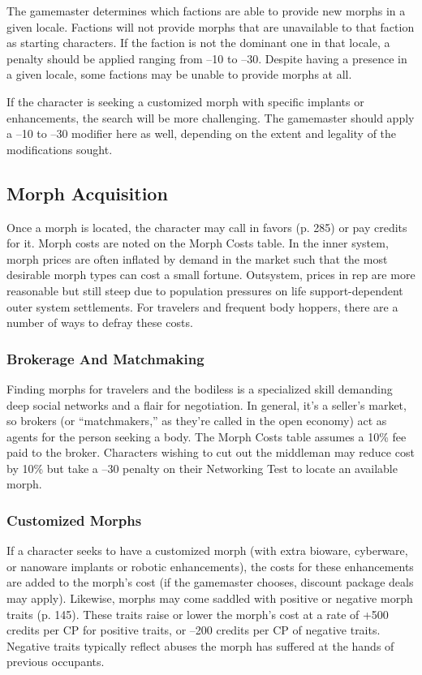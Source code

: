 The gamemaster determines which factions are able 
to provide new morphs in a given locale. Factions 
will not provide morphs that are unavailable to that 
faction as starting characters. If the faction is not the 
dominant one in that locale, a penalty should be applied
ranging from –10 to –30. Despite having a presence
in a given locale, some factions may be unable to
provide morphs at all.

If the character is seeking a customized morph with 
specific implants or enhancements, the search will be 
more challenging. The gamemaster should apply a –10 
to –30 modifier here as well, depending on the extent 
and legality of the modifications sought.

\subsection{Morph Acquisition}

Once a morph is located, the character may call in 
favors (p. 285) or pay credits for it. Morph costs are 
noted on the Morph Costs table. In the inner system, 
morph prices are often inflated by demand in the 
market such that the most desirable morph types can 
cost a small fortune. Outsystem, prices in rep are more 
reasonable but still steep due to population pressures 
on life support-dependent outer system settlements. 
For travelers and frequent body hoppers, there are a 
number of ways to defray these costs.

\subsubsection{Brokerage And Matchmaking}

Finding morphs for travelers and the bodiless is a 
specialized skill demanding deep social networks and 
a flair for negotiation. In general, it's a seller's market, 
so brokers (or ``matchmakers,'' as they're called in 
the open economy) act as agents for the person seeking
a body. The Morph Costs table assumes a 10\%
fee paid to the broker. Characters wishing to cut out 
the middleman may reduce cost by 10\% but take a 
–30 penalty on their Networking Test to locate an 
available morph.

\subsubsection{Customized Morphs}

If a character seeks to have a customized morph 
(with extra bioware, cyberware, or nanoware implants
or robotic enhancements), the costs for these
enhancements are added to the morph's cost (if the 
gamemaster chooses, discount package deals may 
apply). Likewise, morphs may come saddled with 
positive or negative morph traits (p. 145). These 
traits raise or lower the morph's cost at a rate of 
+500 credits per CP for positive traits, or –200 credits
per CP of negative traits. Negative traits typically
reflect abuses the morph has suffered at the hands of 
previous occupants.

